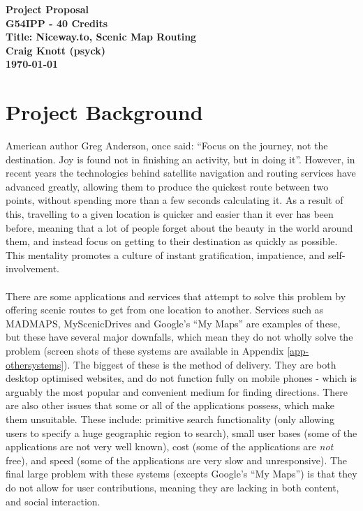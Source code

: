 \documentclass[a4paper,twoside,notitlepage,11pt]{article}
\begin{document}
\pagestyle{empty}
\begin{center}
 {\LARGE \textbf{Project Proposal} \\ [0.2cm]}
 \textbf{G54IPP - 40 Credits}\\
   \textbf{Title: Niceway.to, Scenic Map Routing}\\
    \textbf{Craig Knott (psyck)} \\
	 \textbf{\today}
\end{center}

\section{Project Background}
American author Greg Anderson, once said: ``Focus on the journey, not the destination. Joy is found not in finishing an activity, but in doing it''. However, in recent years the technologies behind satellite navigation and routing services have advanced greatly, allowing them to produce the quickest route between two points, without spending more than a few seconds calculating it. As a result of this, travelling to a given location is quicker and easier than it ever has been before, meaning that a lot of people forget about the beauty in the world around them, and instead focus on getting to their destination as quickly as possible. This mentality promotes a culture of instant gratification, impatience, and self-involvement.
\ \\
\ \\
There are some applications and services that attempt to solve this problem by offering scenic routes to get from one location to another. Services such as MADMAPS, MyScenicDrives and Google's ``My Maps'' are examples of these, but these have several major downfalls, which mean they do not wholly solve the problem (screen shots of these systems are available in Appendix \ref{app-othersystems}). The biggest of these is the method of delivery. They are both desktop optimised websites, and do not function fully on mobile phones - which is arguably the most popular and convenient medium for finding directions. There are also other issues that some or all of the applications possess, which make them unsuitable. These include: primitive search functionality (only allowing users to specify a huge geographic region to search), small user bases (some of the applications are not very well known), cost (some of the applications are \textit{not} free), and speed (some of the applications are very slow and unresponsive). The final large problem with these systems (excepts Google's ``My Maps'') is that they do not allow for user contributions, meaning they are lacking in both content, and social interaction.
\end{document}
